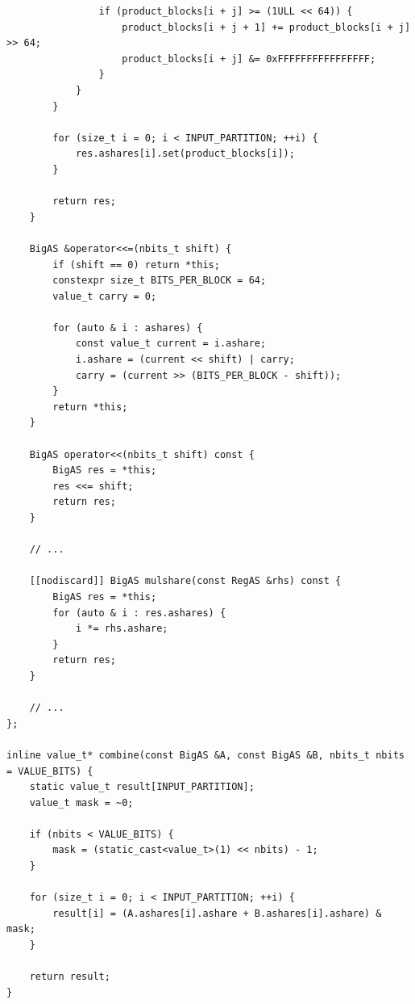 \begin{lstlisting}
                if (product_blocks[i + j] >= (1ULL << 64)) {
                    product_blocks[i + j + 1] += product_blocks[i + j] >> 64;
                    product_blocks[i + j] &= 0xFFFFFFFFFFFFFFFF;
                }
            }
        }

        for (size_t i = 0; i < INPUT_PARTITION; ++i) {
            res.ashares[i].set(product_blocks[i]);
        }

        return res;
    }

    BigAS &operator<<=(nbits_t shift) {
        if (shift == 0) return *this;
        constexpr size_t BITS_PER_BLOCK = 64;
        value_t carry = 0;

        for (auto & i : ashares) {
            const value_t current = i.ashare;
            i.ashare = (current << shift) | carry;
            carry = (current >> (BITS_PER_BLOCK - shift));
        }
        return *this;
    }

    BigAS operator<<(nbits_t shift) const {
        BigAS res = *this;
        res <<= shift;
        return res;
    }

    // ...

    [[nodiscard]] BigAS mulshare(const RegAS &rhs) const {
        BigAS res = *this;
        for (auto & i : res.ashares) {
            i *= rhs.ashare;
        }
        return res;
    }

    // ...
};

inline value_t* combine(const BigAS &A, const BigAS &B, nbits_t nbits = VALUE_BITS) {
    static value_t result[INPUT_PARTITION];
    value_t mask = ~0;

    if (nbits < VALUE_BITS) {
        mask = (static_cast<value_t>(1) << nbits) - 1;
    }

    for (size_t i = 0; i < INPUT_PARTITION; ++i) {
        result[i] = (A.ashares[i].ashare + B.ashares[i].ashare) & mask;
    }

    return result;
}
\end{lstlisting}

